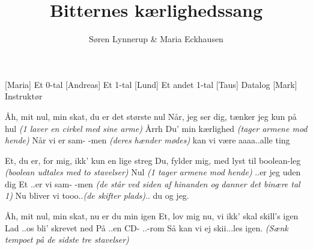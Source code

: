 \documentclass[a4paper,11pt]{article}
\title{Bitternes kærlighedssang}
\author{Søren Lynnerup \& Maria Eckhausen}
\begin{document}
\maketitle

\begin{roles}
[Maria] Et 0-tal
[Andreas] Et 1-tal
[Lund] Et andet 1-tal
[Taus] Datalog
[Mark] Instruktør
\end{roles}

\begin{song}


 Åh, mit nul, min skat, du er det største nul
Når, jeg ser dig, tænker jeg kun på hul \textit{(1 laver en cirkel med sine arme)}
Årrh
 Du' min kærlighed  \textit{(tager armene mod hende)}
 Når
 vi er sam-
 -men   \textit{(deres hænder mødes)}
 kan vi være aaaa..alle ting

 Et, du er, for mig, ikk' kun en lige streg
Du, fylder mig, med lyst til boolean-leg  \textit{(boolean udtales med to stavelser)}
 Nul \textit{(1 tager armene mod hende)}
 ..er jeg uden dig
 Et
 ..er vi sam-
 -men \textit{(de står ved siden af hinanden og danner det binære tal 1)}
 Nu bliver vi tooo..\textit{(de skifter plads)}.. du og jeg.


 Åh, mit nul, min skat, nu er du min igen
 Et, lov mig nu, vi ikk' skal skill's igen
Lad
 ..os bli' skrevet ned
 På
 ..en CD-
 ..-rom
 Så kan vi ej skii...les igen.  \textit{(Sænk tempoet på de sidste tre stavelser)}

\end{song}
\end{document}
